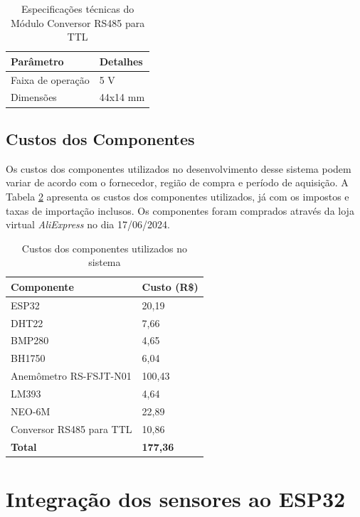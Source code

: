 \begin{table}[!htb]
  \caption{Especificações técnicas do Módulo Conversor RS485 para TTL}
  \begin{tabularx}{\textwidth}{|X|X|} \hline
      \textbf{Parâmetro} & \textbf{Detalhes} \\ \hline
      Faixa de operação & 5 V \\ \hline
      Dimensões & 44x14 mm \\ \hline
  \end{tabularx}
  \label{tab:rs485}
\end{table}

\subsection{Custos dos Componentes}

Os custos dos componentes utilizados no desenvolvimento desse sistema podem variar de acordo com o fornecedor, região de compra e período de aquisição. A Tabela \ref{tab:custos} apresenta os custos dos componentes utilizados, já com os impostos e taxas de importação inclusos. Os componentes foram comprados através da loja virtual \textit{AliExpress} no dia 17/06/2024.

\begin{table}[!htb]
  \caption{Custos dos componentes utilizados no sistema}
  \begin{tabularx}{\textwidth}{|X|X|} \hline
      \textbf{Componente} & \textbf{Custo (R\$)} \\ \hline
      ESP32 & 20,19 \\ \hline
      DHT22 & 7,66 \\ \hline
      BMP280 & 4,65 \\ \hline
      BH1750 & 6,04 \\ \hline
      Anemômetro RS-FSJT-N01 & 100,43 \\ \hline
      LM393 & 4,64 \\ \hline
      NEO-6M & 22,89 \\ \hline
      Conversor RS485 para TTL & 10,86 \\ \hline
      \textbf{Total} & \textbf{177,36} \\ \hline
  \end{tabularx}
  \label{tab:custos}
\end{table}


\section{Integração dos sensores ao ESP32}

